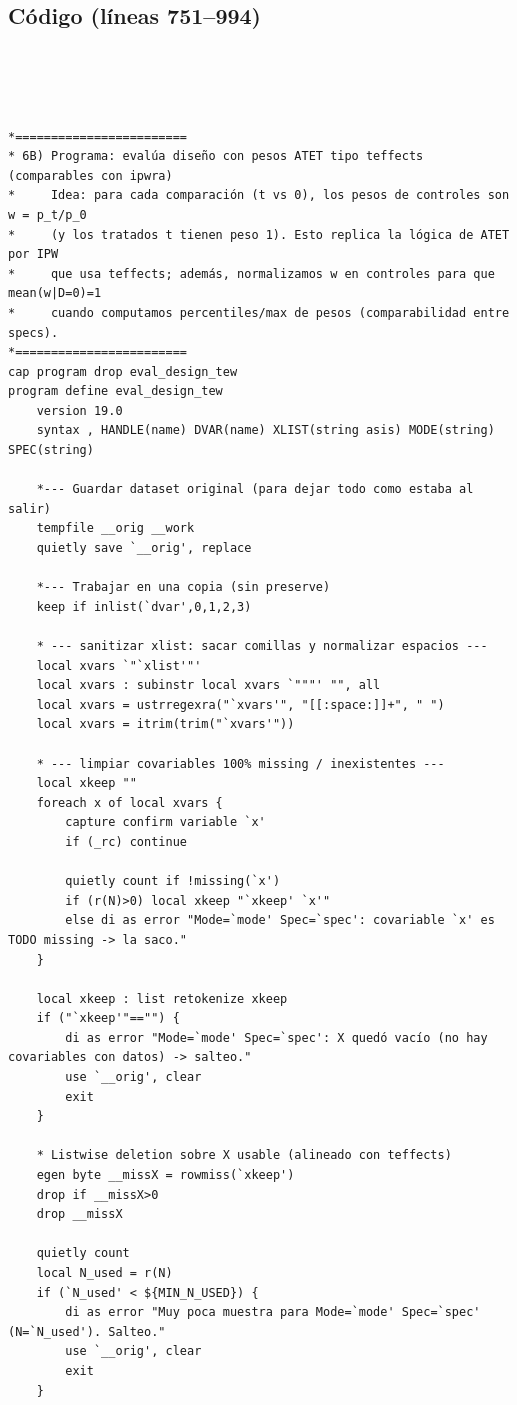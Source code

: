 \documentclass[12pt]{article}
\begin{document}
\subsection*{Código (líneas 751--994)}
\begin{lstlisting}




*========================
* 6B) Programa: evalúa diseño con pesos ATET tipo teffects (comparables con ipwra)
*     Idea: para cada comparación (t vs 0), los pesos de controles son w = p_t/p_0
*     (y los tratados t tienen peso 1). Esto replica la lógica de ATET por IPW
*     que usa teffects; además, normalizamos w en controles para que mean(w|D=0)=1
*     cuando computamos percentiles/max de pesos (comparabilidad entre specs).
*========================
cap program drop eval_design_tew
program define eval_design_tew
    version 19.0
    syntax , HANDLE(name) DVAR(name) XLIST(string asis) MODE(string) SPEC(string)

    *--- Guardar dataset original (para dejar todo como estaba al salir)
    tempfile __orig __work
    quietly save `__orig', replace

    *--- Trabajar en una copia (sin preserve)
    keep if inlist(`dvar',0,1,2,3)

    * --- sanitizar xlist: sacar comillas y normalizar espacios ---
    local xvars `"`xlist'"'
    local xvars : subinstr local xvars `"""' "", all
    local xvars = ustrregexra("`xvars'", "[[:space:]]+", " ")
    local xvars = itrim(trim("`xvars'"))

    * --- limpiar covariables 100% missing / inexistentes ---
    local xkeep ""
    foreach x of local xvars {
        capture confirm variable `x'
        if (_rc) continue

        quietly count if !missing(`x')
        if (r(N)>0) local xkeep "`xkeep' `x'"
        else di as error "Mode=`mode' Spec=`spec': covariable `x' es TODO missing -> la saco."
    }

    local xkeep : list retokenize xkeep
    if ("`xkeep'"=="") {
        di as error "Mode=`mode' Spec=`spec': X quedó vacío (no hay covariables con datos) -> salteo."
        use `__orig', clear
        exit
    }

    * Listwise deletion sobre X usable (alineado con teffects)
    egen byte __missX = rowmiss(`xkeep')
    drop if __missX>0
    drop __missX

    quietly count
    local N_used = r(N)
    if (`N_used' < ${MIN_N_USED}) {
        di as error "Muy poca muestra para Mode=`mode' Spec=`spec' (N=`N_used'). Salteo."
        use `__orig', clear
        exit
    }


\end{lstlisting}
\end{document}
